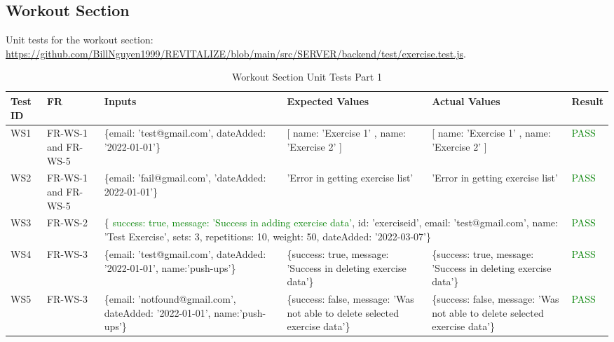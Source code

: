 \documentclass[12pt, titlepage]{article}
\begin{document}
\subsection{Workout Section}
\newpage

Unit tests for the workout section: \url{https://github.com/BillNguyen1999/REVITALIZE/blob/main/src/SERVER/backend/test/exercise.test.js}.
\begin{table}[h]
    \centering
    \small
    \begin{tabularx}{\textwidth}{|X|X|p{3cm}|p{2.5cm}|p{2.5cm}|X|}
        \hline
        Test ID & FR & Inputs & Expected Values & Actual Values & Result \\
        \hline
        WS1 & FR-WS-1 and FR-WS-5 & \{email: 'test@gmail.com', dateAdded: '2022-01-01'\}  & [{ name: 'Exercise 1' }, { name: 'Exercise 2' }] & [{ name: 'Exercise 1' }, { name: 'Exercise 2' }] & \textcolor{Green}{PASS} \\
        \hline
        WS2 & FR-WS-1 and FR-WS-5 & \{email: 'fail@gmail.com', 'dateAdded: 2022-01-01'\}  & 'Error in getting exercise list' & 'Error in getting exercise list' & \textcolor{Green}{PASS} \\
        \hline
        WS3 & FR-WS-2 & \multicolumn{3}{p{8cm}|}{\centering \{ \textcolor{Green}{success: true, message: 'Success in adding exercise data'}, id: 'exerciseid', email: 'test@gmail.com', name: 'Test Exercise', sets: 3, repetitions: 10, weight: 50, dateAdded: '2022-03-07'\}}  &  \textcolor{Green}{PASS}\\
        \hline
        WS4 & FR-WS-3 & \{email: 'test@gmail.com', dateAdded: '2022-01-01', name:'push-ups'\}  & \{success: true, message: 'Success in deleting exercise data'\} & \{success: true, message: 'Success in deleting exercise data'\} & \textcolor{Green}{PASS} \\
        \hline
        WS5 & FR-WS-3 & \{email: 'notfound@gmail.com', dateAdded: '2022-01-01', name:'push-ups'\}  & \{success: false, message: 'Was not able to delete selected exercise data'\} & \{success: false, message: 'Was not able to delete selected exercise data'\} & \textcolor{Green}{PASS} \\
        \hline
    \end{tabularx}
    \caption{Workout Section Unit Tests Part 1}
    \label{table:workout-unit-tests}
\end{table}

\newpage
\end{document}
